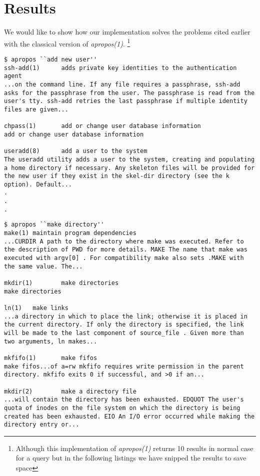 \documentclass[titlepage, a4paper, 12pt]{article}
\begin{document}
\section{Results}
We would like to show how our implementation solves the problems cited earlier
with the classical version of \textit{apropos(1)}.
\footnote{Although this implementation of \textit{apropos(1)} returns 10 results
in normal case for a query but in the following listings we have snipped the
results to save space
}
\begin{lstlisting}
$ apropos ``add new user''
ssh-add(1)      adds private key identities to the authentication agent
...on the command line. If any file requires a passphrase, ssh-add
asks for the passphrase from the user. The passphrase is read from the
user's tty. ssh-add retries the last passphrase if multiple identity
files are given...

chpass(1)       add or change user database information
add or change user database information

useradd(8)      add a user to the system
The useradd utility adds a user to the system, creating and populating
a home directory if necessary. Any skeleton files will be provided for
the new user if they exist in the skel-dir directory (see the k
option). Default...
.
.
.
\end{lstlisting}
\begin{lstlisting}
$ apropos ``make directory''
make(1) maintain program dependencies
...CURDIR A path to the directory where make was executed. Refer to
the description of PWD for more details. MAKE The name that make was
executed with argv[0] . For compatibility make also sets .MAKE with
the same value. The...

mkdir(1)        make directories
make directories

ln(1)   make links
...a directory in which to place the link; otherwise it is placed in
the current directory. If only the directory is specified, the link
will be made to the last component of source_file . Given more than
two arguments, ln makes...

mkfifo(1)       make fifos
make fifos...of a=rw mkfifo requires write permission in the parent
directory. mkfifo exits 0 if successful, and >0 if an...

mkdir(2)        make a directory file
...will contain the directory has been exhausted. EDQUOT The user's
quota of inodes on the file system on which the directory is being
created has been exhausted. EIO An I/O error occurred while making the
directory entry or...
\end{lstlisting}
\end{document}
